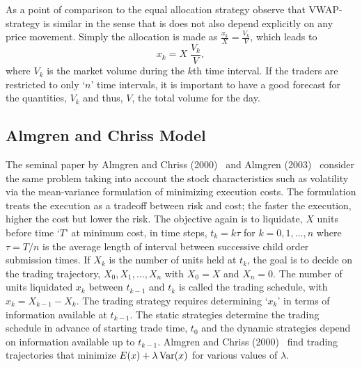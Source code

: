 As a point of comparison to the equal allocation strategy observe that VWAP-strategy is similar in the sense that is does not also depend explicitly on any price movement. Simply the allocation is made as $\frac{x_k}{X}=\frac{V_k}{V}$, which leads to
	\begin{equation}\label{eqn:xk}
	x_k= X \; \dfrac{V_k}{V},
	\end{equation}
where $V_k$ is the market volume during the $k$th time interval. If the traders are restricted to only `$n$' time intervals, it is important to have a good forecast for the quantities, $V_k$ and thus, $V$, the total volume for the day. 



\subsection{Almgren and Chriss Model}

The seminal paper by Almgren and Chriss (2000)~\cite{alm2000} and Almgren (2003)~\cite{almgren2003} consider the same problem taking into account the stock characteristics such as volatility via the mean-variance formulation of minimizing execution costs. The formulation treats the execution as a tradeoff between risk and cost; the faster the execution, higher the cost but lower the risk. The objective again is to liquidate, $X$ units before time `$T$' at minimum cost, in time steps, $t_k = k\tau$ for $k = 0,1,\ldots, n$ where $\tau = T/n$ is the average length of interval between successive child order submission times. If $X_k$ is the number of units held at $t_k$, the goal is to decide on the trading trajectory, $X_0,X_1,\ldots,X_n$ with $X_0=X$ and $X_n=0$. The number of units liquidated $x_k$ between $t_{k-1}$ and $t_k$ is called the trading schedule, with $x_k = X_{k-1} - X_k$. The trading strategy requires determining `$x_k$' in terms of information available at $t_{k-1}$. The static strategies determine the trading schedule in advance of starting trade time, $t_0$ and the dynamic strategies depend on information available up to $t_{k-1}$. Almgren and Chriss (2000)~\cite{alm2000} find trading trajectories that minimize $E(x)+\lambda \operatorname{Var}(x)$ for various values of $\lambda$.



